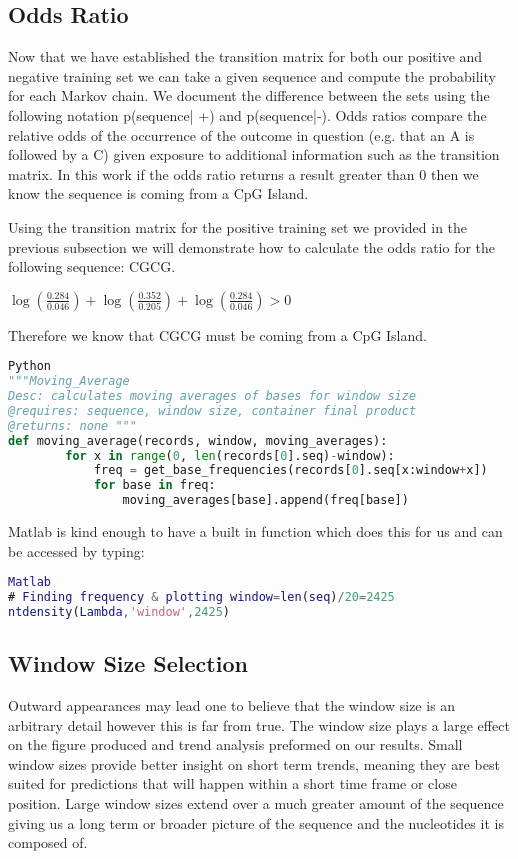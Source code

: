 \documentclass[paper=letter, fontsize=12pt]{article}
\begin{document}
\subsection{Odds Ratio}
Now that we have established the transition matrix for both our positive and negative training set we can take a given sequence and compute the probability for each Markov chain. We document the difference between the sets using the following notation p(sequence| +) and p(sequence|-).  Odds ratios compare the relative odds of the occurrence of the outcome in question (e.g. that an A is followed by a C) given exposure to additional information such as the transition matrix. In this work if the odds ratio returns a result greater than 0 then we know the sequence is coming from a CpG Island.

Using the transition matrix for the positive training set we provided in the previous subsection we will demonstrate how to calculate the odds ratio for the following sequence: CGCG.

$\log(\frac{0.284}{0.046}) + \log(\frac{0.352}{0.205}) + \log(\frac{0.284}{0.046}) > 0 $

Therefore we know that CGCG must be coming from a CpG Island.


\begin{lstlisting}[language=Python]
Python
"""Moving_Average
Desc: calculates moving averages of bases for window size
@requires: sequence, window size, container final product
@returns: none """
def moving_average(records, window, moving_averages):
        for x in range(0, len(records[0].seq)-window):
            freq = get_base_frequencies(records[0].seq[x:window+x])
            for base in freq:
                moving_averages[base].append(freq[base])

\end{lstlisting}

Matlab is kind enough to have a built in function which does this for us and can be accessed by typing:
\begin{lstlisting}[language=Matlab]
Matlab
# Finding frequency & plotting window=len(seq)/20=2425
ntdensity(Lambda,'window',2425)
\end{lstlisting}

\subsection{Window Size Selection}
Outward appearances may lead one to believe that the window size is an arbitrary detail however this is far from true. The window size plays a large effect on the figure produced and trend analysis preformed on our results. Small window sizes provide better insight on short term trends, meaning they are best suited for predictions that will happen within a short time frame or close position. Large window sizes extend over a much greater amount of the sequence giving us a long term or broader picture of the sequence and the nucleotides it is composed of.
\end{document}

